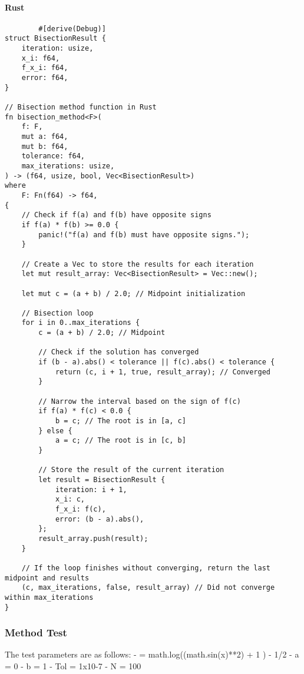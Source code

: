 \documentclass{article}
\begin{document}
    \paragraph{Rust}
    \begin{verbatim}
        #[derive(Debug)]
struct BisectionResult {
    iteration: usize,
    x_i: f64,
    f_x_i: f64,
    error: f64,
}

// Bisection method function in Rust
fn bisection_method<F>(
    f: F,
    mut a: f64,
    mut b: f64,
    tolerance: f64,
    max_iterations: usize,
) -> (f64, usize, bool, Vec<BisectionResult>)
where
    F: Fn(f64) -> f64,
{
    // Check if f(a) and f(b) have opposite signs
    if f(a) * f(b) >= 0.0 {
        panic!("f(a) and f(b) must have opposite signs.");
    }

    // Create a Vec to store the results for each iteration
    let mut result_array: Vec<BisectionResult> = Vec::new();

    let mut c = (a + b) / 2.0; // Midpoint initialization

    // Bisection loop
    for i in 0..max_iterations {
        c = (a + b) / 2.0; // Midpoint

        // Check if the solution has converged
        if (b - a).abs() < tolerance || f(c).abs() < tolerance {
            return (c, i + 1, true, result_array); // Converged
        }

        // Narrow the interval based on the sign of f(c)
        if f(a) * f(c) < 0.0 {
            b = c; // The root is in [a, c]
        } else {
            a = c; // The root is in [c, b]
        }

        // Store the result of the current iteration
        let result = BisectionResult {
            iteration: i + 1,
            x_i: c,
            f_x_i: f(c),
            error: (b - a).abs(),
        };
        result_array.push(result);
    }

    // If the loop finishes without converging, return the last midpoint and results
    (c, max_iterations, false, result_array) // Did not converge within max_iterations
}
    \end{verbatim}

\subsubsection{Method Test}\label{subsec:method-test}
The test parameters are as follows:
        - \textflorin = math.log((math.sin(x)**2) + 1 ) - 1/2
        - a = 0
        - b = 1
        - Tol = 1x10-7
        - N = 100
\end{document}
